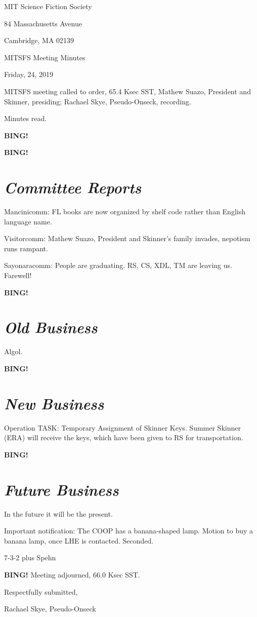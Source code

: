 \documentclass[10pt]{article}
\newcommand{\bing}{{\bf BING!} }
\newcommand{\goto}[1]{\bing \vskip 12pt \section*{{\em{#1}}}}
\newcommand{\ps}{ plus Spehn\xspace}
\newcommand{\skinner}{Mathew Suazo, President and Skinner}
\newcommand{\onseck}{Rachael Skye, Pseudo-Onseck}
\newcommand{\meetingdate}{Friday, 24, 2019 }
\begin{document}
\begin{center}

MIT Science Fiction Society

84 Massachusetts Avenue

Cambridge, MA 02139

\vspace{12pt}

MITSFS Meeting Minutes

\meetingdate

\end{center}

\vspace{18pt}

\setlength{\parskip}{6pt}

\noindent
MITSFS meeting called to order, 65.4 Ksec SST,
\skinner, presiding; \onseck, recording.

Minutes read.

\bing

\goto{Committee Reports}

Mancinicomm: FL books are now organized by shelf code rather than English language name.

Visitorcomm: \skinner's family invades, nepotism runs rampant.

Sayonaracomm: People are graduating. RS, CS, XDL, TM are leaving us. Farewell!

\goto{Old Business}

Algol.

\goto{New Business}

Operation TASK: Temporary Assignment of Skinner Keys. Summer Skinner (ERA) will receive the keys, which have been given to RS for transportation.

\goto{Future Business}

In the future it will be the present.

Important notification:
The COOP has a banana-shaped lamp. Motion to buy a banana lamp, once LHE is contacted.
Seconded.

7-3-2\ps

\bing
\noindent
Meeting adjourned, 66.0 Ksec SST.

\vspace{18pt}

\centerline{Respectfully submitted,}
\centerline{\onseck}
\end{document}
